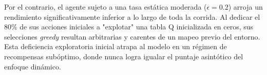 \documentclass[11pt,a4paper]{article}
\begin{document}
Por el contrario, el agente sujeto a una tasa estática moderada ($\epsilon = 0.2$) arroja un rendimiento significativamente inferior a lo largo de toda la corrida. Al dedicar el 80\% de sus acciones iniciales a "explotar" una tabla Q inicializada en ceros, sus selecciones \textit{greedy} resultan arbitrarias y carentes de un mapeo previo del entorno. Esta deficiencia exploratoria inicial atrapa al modelo en un régimen de recompensas subóptimo, donde nunca logra igualar el puntaje asintótico del enfoque dinámico.
\end{document}
